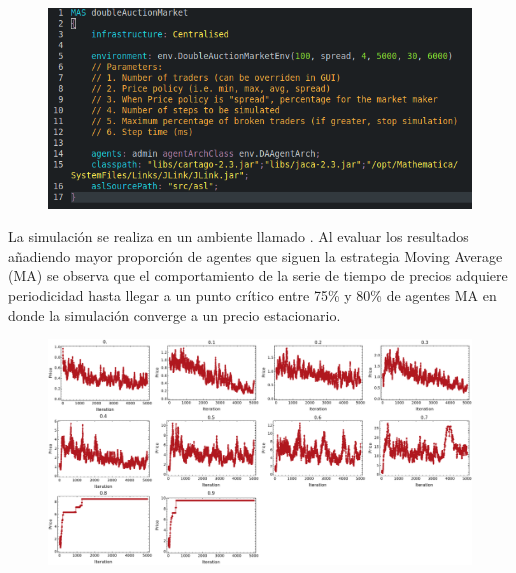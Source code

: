 \markdownRendererInterblockSeparator
{}\begin{figure}[h!] \centering \includegraphics[scale=0.4]{img/code.png} \end{figure}\markdownRendererInterblockSeparator
{}\markdownRendererUlBegin
\markdownRendererUlItem La simulación se realiza en un ambiente llamado .\markdownRendererUlItemEnd 
\markdownRendererUlEnd \markdownRendererInterblockSeparator
{}\markdownRendererHorizontalRule{}\markdownRendererInterblockSeparator
{}\markdownRendererInterblockSeparator
{}Al evaluar los resultados añadiendo mayor proporción de agentes que siguen la estrategia Moving Average (MA) se observa que el comportamiento de la serie de tiempo de precios adquiere periodicidad hasta llegar a un punto crítico entre 75\% y 80\% de agentes MA en donde la simulación converge a un precio estacionario.\markdownRendererInterblockSeparator
{}\begin{figure}[h!] \centering \includegraphics[scale=0.2]{img/price_series.png} \end{figure}\markdownRendererInterblockSeparator
{}\markdownRendererHorizontalRule{}\relax